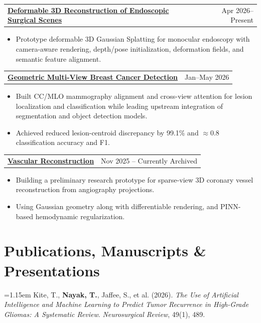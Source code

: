 \documentclass[letterpaper,10pt]{article}
\makeatletter
\newlength{\entrygap}
\newlength{\pubgap}
\newcommand{\cvProject}[2]{%
  \needspace{3\baselineskip}%
  \begin{tabularx}{\textwidth}{@{}X@{\hspace{0.5em}}r@{}}
    \textbf{#1} & {\small #2}
  \end{tabularx}\par\vspace{1pt}%
}
\newenvironment{cvitems}{%
  \begin{itemize}[leftmargin=0.17in,label=\textbullet,
    topsep=0pt,itemsep=2pt,parsep=0pt,partopsep=0pt]
  \normalsize
}{%
  \end{itemize}\vspace{\entrygap}%
}
\newcommand{\cvPub}[1]{%
  \needspace{2\baselineskip}%
  \begingroup\normalsize\hangindent=1.15em\hangafter=1\noindent #1\par\endgroup
  \vspace{\pubgap}%
}
\newcommand{\pubLabel}[1]{%
  \vspace{1pt}{\small\bfseries #1}\par\vspace{1pt}%
}
\makeatother
\begin{document}
\cvProject{\href{https://github.com/tushar-nayak/endo-splat}{Deformable 3D Reconstruction of Endoscopic Surgical Scenes}}{Apr 2026--Present}
\begin{cvitems}
  \item Prototype deformable 3D Gaussian Splatting for monocular endoscopy with camera-aware
        rendering, depth/pose initialization, deformation fields, and semantic feature alignment.
\end{cvitems}

\cvProject{\href{https://github.com/tushar-nayak/grading-cbisddsm}{Geometric Multi-View Breast Cancer Detection}}{Jan--May 2026}
\begin{cvitems}
  \item Built CC/MLO mammography alignment and cross-view attention for lesion localization and classification while leading upstream integration of segmentation and object detection models.
  \item Achieved reduced lesion-centroid discrepancy by 99.1\% and $\approx 0.8 $ classification accuracy and F1. 
\end{cvitems}

\cvProject{\href{https://github.com/tushar-nayak/vascular-reconstruction}{Vascular Reconstruction}}{Nov 2025 -- Currently Archived}
\begin{cvitems}
  \item Building a preliminary research prototype for sparse-view 3D coronary vessel reconstruction from angiography projections.
  \item Using Gaussian geometry along with differentiable rendering, and PINN-based hemodynamic regularization.
\end{cvitems}

\section{Publications, Manuscripts \& Presentations}

\setlength{\pubgap}{2pt}


\pubLabel{Journal Publications}

\cvPub{
Kite, T., \textbf{Nayak, T.}, Jaffee, S., et al. (2026).
\textit{The Use of Artificial Intelligence and Machine Learning
to Predict Tumor Recurrence in High-Grade Gliomas:
A Systematic Review}.
\textit{Neurosurgical Review}, 49(1), 489.
}
\end{document}
